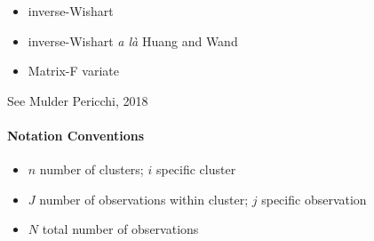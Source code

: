 \documentclass[a4paper]{article}
\begin{document}
\begin{itemize}
	\item inverse-Wishart
	
	\item inverse-Wishart \textit{a là} Huang and Wand
	
	\item Matrix-F variate
\end{itemize}

See Mulder Pericchi, 2018

\paragraph{Notation Conventions}

\begin{itemize}
	\item $n$ number of clusters; $i$ specific cluster
	\item $J$ number of observations within cluster; $j$ specific observation
	\item $N$ total number of observations
\end{itemize}
\end{document}
